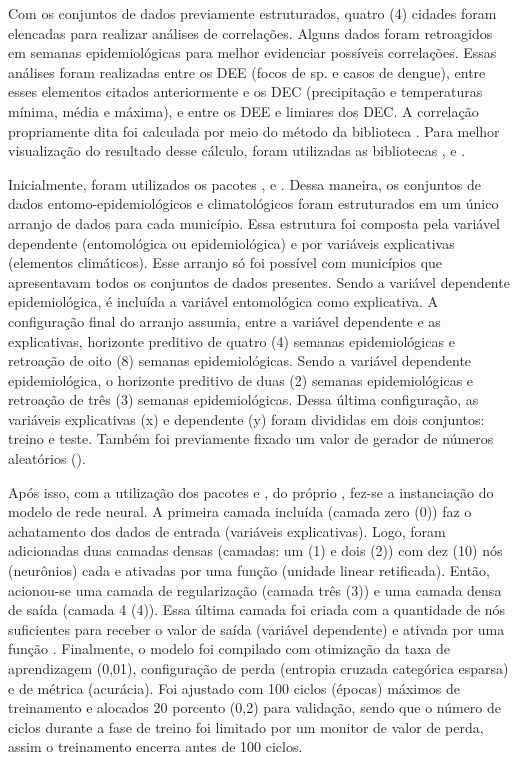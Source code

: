 \indent Com os conjuntos de dados previamente estruturados, quatro (4) cidades foram elencadas para realizar análises de correlações. Alguns dados foram retroagidos em semanas epidemiológicas para melhor evidenciar possíveis correlações. Essas análises foram realizadas entre os \acrshort{DEE} (focos de  sp. e casos de dengue), entre esses elementos citados anteriormente e os \acrshort{DEC} (precipitação e temperaturas mínima, média e máxima), e entre os \acrshort{DEE} e limiares dos \acrshort{DEC}. A correlação propriamente dita foi calculada por meio do método  da biblioteca . Para melhor visualização do resultado desse cálculo, foram utilizadas as bibliotecas ,  e  \cite{seaborn_2021_waskom}.

\indent Inicialmente, foram utilizados os pacotes ,  e  \cite{scikit-learn_2011_pedregosa, sklearn_2013_buitinck}. Dessa maneira, os conjuntos de dados entomo-epidemiológicos e climatológicos foram estruturados em um único arranjo de dados para cada município. Essa estrutura foi composta pela variável dependente (entomológica ou epidemiológica) e por variáveis explicativas (elementos climáticos). Esse arranjo só foi possível com municípios que apresentavam todos os conjuntos de dados presentes. Sendo a variável dependente epidemiológica, é incluída a variável entomológica como explicativa. A configuração final do arranjo assumia, entre a variável dependente e as explicativas, horizonte preditivo de quatro (4) semanas epidemiológicas e retroação de oito (8) semanas epidemiológicas. Sendo a variável dependente epidemiológica, o horizonte preditivo de duas (2) semanas epidemiológicas e retroação de três (3) semanas epidemiológicas. Dessa última configuração, as variáveis explicativas (x) e dependente (y) foram divididas em dois conjuntos: treino e teste. Também foi previamente fixado um valor de gerador de números aleatórios ().

\indent Após isso, com a utilização dos pacotes \cite{tensorflow_2015_whitepaper} e  \cite{keras_2015_chollet}, do próprio , fez-se a instanciação do modelo de rede neural. A primeira camada incluída (camada zero (0)) faz o achatamento dos dados de entrada (variáveis explicativas). Logo, foram adicionadas duas camadas densas (camadas: um (1) e dois (2)) com dez (10) nós (neurônios) cada e ativadas por uma função  (unidade linear retificada). Então, acionou-se uma camada de regularização (camada três (3)) e uma camada densa de saída (camada 4 (4)). Essa última camada foi criada com a quantidade de nós suficientes para receber o valor de saída (variável dependente) e ativada por uma função . Finalmente, o modelo foi compilado com otimização da taxa de aprendizagem (0,01), configuração de perda (entropia cruzada categórica esparsa) e de métrica (acurácia). Foi ajustado com 100 ciclos (épocas) máximos de treinamento e alocados 20 porcento (0,2) para validação, sendo que o número de ciclos durante a fase de treino foi limitado por um monitor de valor de perda, assim o treinamento encerra antes de 100 ciclos.


